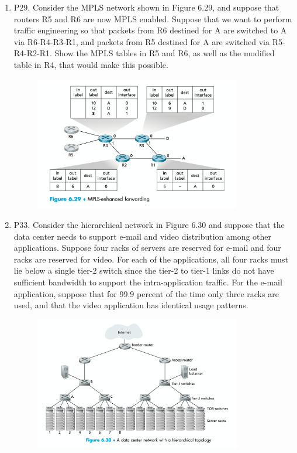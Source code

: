 \documentclass[12pt]{article}
\begin{document}
\begin{enumerate}
    \item P29. Consider the MPLS network shown in Figure 6.29, and suppose that routers R5 and R6 are now MPLS enabled. Suppose that we want to perform traffic engineering so that packets from R6 destined for A are switched to A via R6-R4-R3-R1, and packets from R5 destined for A are switched via R5-R4-R2-R1. Show the MPLS tables in R5 and R6, as well as the modified table in R4, that would make this possible.
    \begin{figure}[h!]
        \centering
        \includegraphics[width=0.85\textwidth]{Fig6.29.png}
    \end{figure}
    \item P33. Consider the hierarchical network in Figure 6.30 and suppose that the data center needs to support e-mail and video distribution among other applications. Suppose four racks of servers are reserved for e-mail and four racks are reserved for video. For each of the applications, all four racks must lie below a single tier-2 switch since the tier-2 to tier-1 links do not have sufficient bandwidth to support the intra-application traffic. For the e-mail application, suppose that for 99.9 percent of the time only three racks are used, and that the video application has identical usage patterns.
    \begin{figure}[h!]
        \centering
        \includegraphics[width=0.85\textwidth]{Fig6.30.png}

\end{figure}
\end{enumerate}
\end{document}
